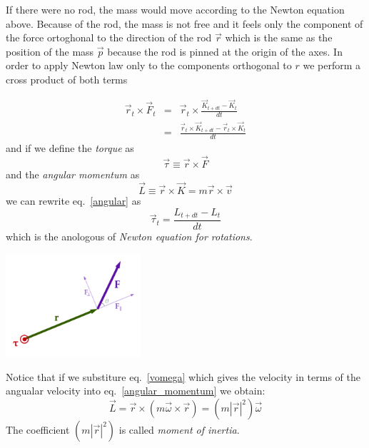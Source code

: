 \documentclass[12pt]{article}
\begin{document}
If there were no rod, the mass would move according to the Newton equation above. Because of the rod, the mass is not free and it feels only the component of the force ortoghonal to the direction of the rod $\vec r$ which is the same as the position of the mass $\vec p$ because the rod is pinned at the origin of the axes. In order to apply Newton law only to the components orthogonal to $r$ we perform a cross product of both terms

\begin{eqnarray}
\vec r_t \times \vec F_t &=& \vec r_t \times \frac{\vec  K_{t+dt}-\vec  K_t}{dt} \\
&=&  \frac{\vec r_t \times\vec K_{t+dt}-\vec r_t \times \vec  K_t}{dt}
\label{angular}
\end{eqnarray}
and if we define the {\it torque} as
\begin{equation}
\vec \tau \equiv \vec r \times \vec F
\end{equation}
and the {\it angular momentum} as
\begin{equation}
\vec L \equiv \vec r \times \vec K = m  \vec r \times \vec v
\label{angular_momentum}
\end{equation}
we can rewrite eq.~\ref{angular} as 
\begin{equation}
\vec \tau_ t = \frac{L_{t+dt}-L_t}{dt}
\label{newton_rot}
\end{equation}
which is the anologous of {\it Newton equation for rotations}.

\begin{center}
\includegraphics[width=5cm]{images/torque.png}
\end{center}

Notice that if we substiture eq.~\ref{vomega} which gives the velocity in terms of the angualar velocity into eq.~\ref{angular_momentum} we obtain:
\begin{equation}
\vec L = \vec r \times (m \vec \omega \times \vec r) = (m |\vec r|^2) \vec \omega
\label{angular_momentum2}
\end{equation}
The coefficient $(m |\vec r|^2)$ is called {\it moment of inertia}.
\end{document}
